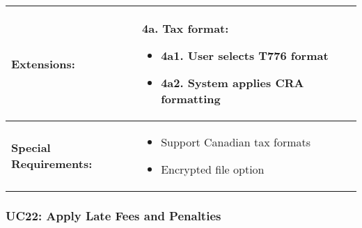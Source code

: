\documentclass[12pt]{article}
\begin{document}
\begin{tabular}{|p{3cm}|p{11cm}|}
\hline
\textbf{Extensions:} & 
\textbf{4a. Tax format:}
\begin{itemize}
    \item 4a1. User selects T776 format
    \item 4a2. System applies CRA formatting
\end{itemize} \\
\hline
\textbf{Special Requirements:} & 
\begin{itemize}
    \item Support Canadian tax formats
    \item Encrypted file option
\end{itemize} \\
\hline
\end{tabular}

\subsubsection{UC22: Apply Late Fees and Penalties}
\end{document}
